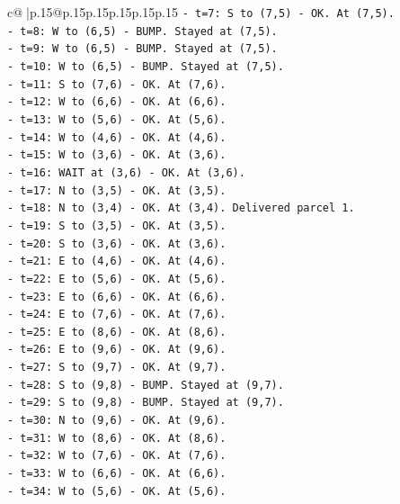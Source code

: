 \documentclass{article}
\begin{document}
{\begin{supertabular}{c@{$\;$}|p{.15\linewidth}@{}p{.15\linewidth}p{.15\linewidth}p{.15\linewidth}p{.15\linewidth}p{.15\linewidth}}
{{{\texttt{{-} t=7: S to (7,5) {-} OK. At (7,5).} \\
\texttt{{-} t=8: W to (6,5) {-} BUMP. Stayed at (7,5).} \\
\texttt{{-} t=9: W to (6,5) {-} BUMP. Stayed at (7,5).} \\
\texttt{{-} t=10: W to (6,5) {-} BUMP. Stayed at (7,5).} \\
\texttt{{-} t=11: S to (7,6) {-} OK. At (7,6).} \\
\texttt{{-} t=12: W to (6,6) {-} OK. At (6,6).} \\
\texttt{{-} t=13: W to (5,6) {-} OK. At (5,6).} \\
\texttt{{-} t=14: W to (4,6) {-} OK. At (4,6).} \\
\texttt{{-} t=15: W to (3,6) {-} OK. At (3,6).} \\
\texttt{{-} t=16: WAIT at (3,6) {-} OK. At (3,6).} \\
\texttt{{-} t=17: N to (3,5) {-} OK. At (3,5).} \\
\texttt{{-} t=18: N to (3,4) {-} OK. At (3,4). Delivered parcel 1.} \\
\texttt{{-} t=19: S to (3,5) {-} OK. At (3,5).} \\
\texttt{{-} t=20: S to (3,6) {-} OK. At (3,6).} \\
\texttt{{-} t=21: E to (4,6) {-} OK. At (4,6).} \\
\texttt{{-} t=22: E to (5,6) {-} OK. At (5,6).} \\
\texttt{{-} t=23: E to (6,6) {-} OK. At (6,6).} \\
\texttt{{-} t=24: E to (7,6) {-} OK. At (7,6).} \\
\texttt{{-} t=25: E to (8,6) {-} OK. At (8,6).} \\
\texttt{{-} t=26: E to (9,6) {-} OK. At (9,6).} \\
\texttt{{-} t=27: S to (9,7) {-} OK. At (9,7).} \\
\texttt{{-} t=28: S to (9,8) {-} BUMP. Stayed at (9,7).} \\
\texttt{{-} t=29: S to (9,8) {-} BUMP. Stayed at (9,7).} \\
\texttt{{-} t=30: N to (9,6) {-} OK. At (9,6).} \\
\texttt{{-} t=31: W to (8,6) {-} OK. At (8,6).} \\
\texttt{{-} t=32: W to (7,6) {-} OK. At (7,6).} \\
\texttt{{-} t=33: W to (6,6) {-} OK. At (6,6).} \\
\texttt{{-} t=34: W to (5,6) {-} OK. At (5,6).} \\
}}}
\end{supertabular}}
\end{document}

